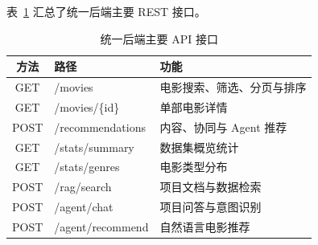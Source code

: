 表~\ref{tab:api-list} 汇总了统一后端主要 REST 接口。

\begin{table}[htbp]
    \centering
    \caption{统一后端主要 API 接口} \label{tab:api-list}
    \renewcommand{\arraystretch}{1.15}
    \setlength{\tabcolsep}{8pt}
    \begin{tabularx}{\textwidth}{|c|l|X|}
        \hline
        \textbf{方法} & \textbf{路径} & \textbf{功能} \\
        \hline
        GET  & /movies              & 电影搜索、筛选、分页与排序 \\
        \hline
        GET  & /movies/\{id\}       & 单部电影详情 \\
        \hline
        POST & /recommendations     & 内容、协同与 Agent 推荐 \\
        \hline
        GET  & /stats/summary       & 数据集概览统计 \\
        \hline
        GET  & /stats/genres        & 电影类型分布 \\
        \hline
        POST & /rag/search          & 项目文档与数据检索 \\
        \hline
        POST & /agent/chat          & 项目问答与意图识别 \\
        \hline
        POST & /agent/recommend     & 自然语言电影推荐 \\
        \hline
    \end{tabularx}
\end{table}
